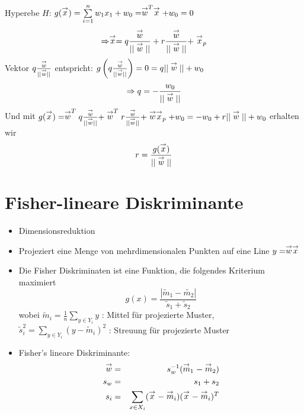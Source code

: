 Hyperebe $H$: $g(\stackrel{\to}{x}) = \sum\limits_{i=1}^n w_1x_1 + w_0 = \stackrel{\to}{w}^T \stackrel{\to}{x} + w_0 = 0$
$$\Rightarrow \stackrel{\to}{x} = q \frac{\stackrel{\to}{w}}{|| \stackrel{\to}{w} ||} + r \frac{\stackrel{\to}{w}}{|| \stackrel{\to}{w} ||} + \stackrel{\to}{x}_p$$
Vektor $q \frac{\stackrel{\to}{w}}{|| \stackrel{\to}{w} ||}$ entspricht: $g \left(q \frac{\stackrel{\to}{w}}{|| \stackrel{\to}{w} ||} \right) = 0 = q ||\stackrel{\to}{w}|| + w_0$ $$\Rightarrow q = - \frac{w_0}{|| \stackrel{\to}{w} ||}$$
Und mit $g(\stackrel{\to}{x}) = \stackrel{\to}{w}^T q \frac{\stackrel{\to}{w}}{|| \stackrel{\to}{w} ||} + \stackrel{\to}{w}^T r \frac{\stackrel{\to}{w}}{|| \stackrel{\to}{w} ||} + \stackrel{\to}{w} \stackrel{\to}{x}_p + w_0 = -w_0 + r ||\stackrel{\to}{w}|| + w_0$ erhalten wir $$r = \frac{g(\stackrel{\to}{x})}{|| \stackrel{\to}{w} ||}$$


\section{Fisher-lineare Diskriminante}

\begin{itemize}
\item Dimensionsreduktion
\item Projeziert eine Menge von mehrdimensionalen Punkten auf eine Line $y = \stackrel{\to}{w} \stackrel{\to}{x}$
\item Die Fisher Diskriminaten ist eine Funktion, die folgendes Kriterium maximiert $$g(x) = \frac{| \tilde{m}_1 - \tilde{m_2}|}{\tilde{s}_1 + \tilde{s}_2}$$
wobei $\tilde{m}_i = \frac{1}{n} \sum\limits_{y \in Y_i} y$ : Mittel für projezierte Muster, $\tilde{s}_i^2 = \sum\limits_{y \in Y_i} (y - \tilde{m}_i)^2$ : Streuung für projezierte Muster
\item Fisher's lineare Diskriminante:
\begin{eqnarray*}
\stackrel{\to}{w} &=& s_w^{-1} (\stackrel{\to}{m}_1 - \stackrel{\to}{m}_2) \\ s_w &=& s_1 + s_2 \\ s_i &=& \sum\limits_{x \in X_i} (\stackrel{\to}{x} - \stackrel{\to}{m}_i)(\stackrel{\to}{x} - \stackrel{\to}{m}_i)^T
\end{eqnarray*}
\end{itemize}






